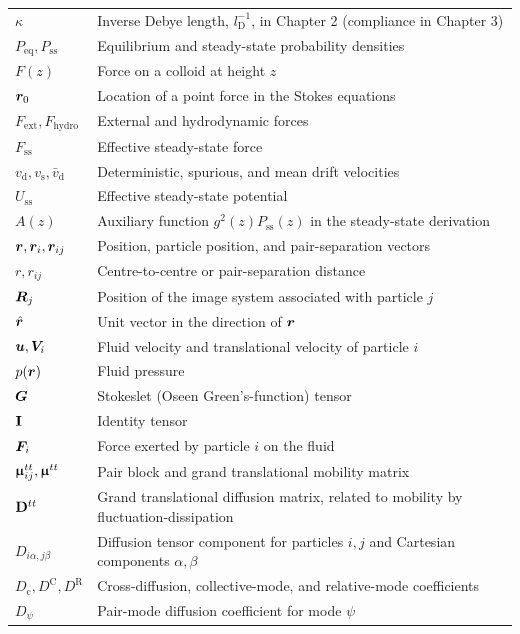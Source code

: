 \begin{longtable}{p{3cm}p{11cm}}
$\kappa$ & Inverse Debye length, $l_\mathrm{D}^{-1}$, in Chapter 2 (compliance in Chapter 3) \\
$P_\mathrm{eq},P_\mathrm{ss}$ & Equilibrium and steady-state probability densities \\
$F(z)$ & Force on a colloid at height $z$ \\
$\bm{r}_0$ & Location of a point force in the Stokes equations \\
$F_\mathrm{ext},F_\mathrm{hydro}$ & External and hydrodynamic forces \\
$F_\mathrm{ss}$ & Effective steady-state force \\
$v_\mathrm{d},v_\mathrm{s},\bar v_\mathrm{d}$ & Deterministic, spurious, and mean drift velocities \\
$U_\mathrm{ss}$ & Effective steady-state potential \\
$A(z)$ & Auxiliary function $g^2(z)P_\mathrm{ss}(z)$ in the steady-state derivation \\
$\bm{r},\bm{r}_i,\bm{r}_{ij}$ & Position, particle position, and pair-separation vectors \\
$r,r_{ij}$ & Centre-to-centre or pair-separation distance \\
$\bm{R}_j$ & Position of the image system associated with particle $j$ \\
$\hat{\bm{r}}$ & Unit vector in the direction of $\bm{r}$ \\
$\bm{u},\bm{V}_i$ & Fluid velocity and translational velocity of particle $i$ \\
$p(\bm{r})$ & Fluid pressure \\
$\bm{G}$ & Stokeslet (Oseen Green's-function) tensor \\
$\mathbf{I}$ & Identity tensor \\
$\bm{F}_i$ & Force exerted by particle $i$ on the fluid \\
$\bm{\upmu}_{ij}^{tt},\bm{\upmu}^{tt}$ & Pair block and grand translational mobility matrix \\
$\mathbf{D}^{tt}$ & Grand translational diffusion matrix, related to mobility by fluctuation-dissipation \\
$D_{i\alpha,j\beta}$ & Diffusion tensor component for particles $i,j$ and Cartesian components $\alpha,\beta$ \\
$D_\mathrm{c},D^\mathrm{C},D^\mathrm{R}$ & Cross-diffusion, collective-mode, and relative-mode coefficients \\
$D_\psi$ & Pair-mode diffusion coefficient for mode $\psi$ \\

\end{longtable}
